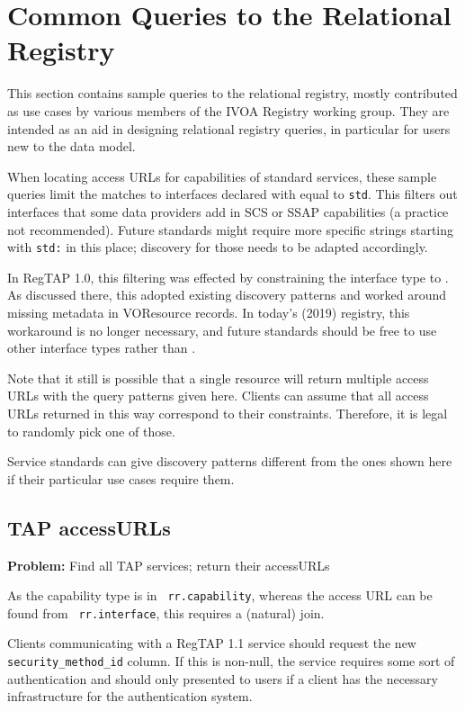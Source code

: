 \documentclass[11pt,a4paper]{ivoa}
\newcommand{\rtent}[1]{\texttt{\color{rtcolor} #1}}
\begin{document}
\section{Common Queries to the Relational Registry}

\label{sample_queries}

This section contains sample queries to the relational registry,
mostly contributed as use cases by various members of the IVOA Registry
working group.  They are intended as an aid in designing relational
registry queries, in particular for users new to the data model.

When locating access URLs for capabilities of standard services, these
sample queries limit the matches to interfaces declared with
 equal to \verb|std|.
This filters out  interfaces that some data providers
add in SCS or SSAP capabilities (a practice not recommended).
Future standards might require more specific strings starting with
\verb|std:| in this place; discovery for those needs to be adapted
accordingly.

In RegTAP 1.0, this filtering was effected by constraining the interface
type to .  As discussed there, this adopted
existing discovery patterns and worked around missing metadata in
VOResource records.  In today's (2019) registry, this workaround is no
longer necessary, and future standards should be free to use other
interface types rather than .

Note that it still is possible that a single resource will return
multiple access URLs with the query patterns given here.  Clients can
assume that all access URLs returned in this way correspond to their
constraints.  Therefore, it is legal to randomly pick one of those.

Service standards can give discovery patterns different from the ones
shown here if their particular use cases require them.

\subsection{TAP accessURLs}
\textbf{Problem:} Find all TAP services; return their accessURLs

As the capability type is in 
\rtent{rr.capability}, whereas the access URL can be
found from 
\rtent{rr.interface}, this requires
a (natural) join.

Clients communicating with a RegTAP 1.1 service should request the new
\rtent{security\_method\_id} column.  If this is non-null, the service
requires some sort of authentication and should only presented to users
if a client has the necessary infrastructure for the authentication
system.
\end{document}
